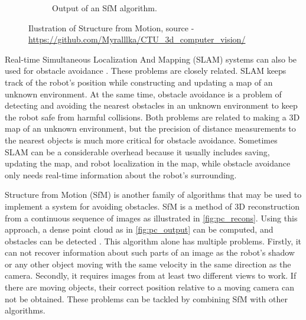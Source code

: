 \begin{figure}[h]
\begin{subfigure}[h]{0.65\textwidth}
      \caption{Output of an SfM algorithm.}
      \label{fig:pc_output}
    \end{subfigure}
    \caption[Ilustration of Structure from Motion.]{Ilustration of Structure from Motion, source - \url{https://github.com/Myralllka/CTU_3d_computer_vision/}}
    \label{fig:pc_recons}
\end{figure}

Real-time Simultaneous Localization And Mapping (SLAM) systems can also be used for obstacle avoidance \cite{Moreno2014}. 
These problems are closely related. 
SLAM keeps track of the robot's position while constructing and updating a map of an unknown environment. 
At the same time, obstacle avoidance is a problem of detecting and avoiding the nearest obstacles in an unknown environment to keep the robot safe from harmful collisions.
Both problems are related to making a 3D map of an unknown environment, but the precision of distance measurements to the nearest objects is much more critical for obstacle avoidance.
Sometimes SLAM can be a considerable overhead because it usually includes saving, updating the map, and robot localization in the map, while obstacle avoidance only needs real-time information about the robot's surrounding.

Structure from Motion (SfM) is another family of algorithms that may be used to implement a system for avoiding obstacles. 
SfM is a method of 3D reconstruction from a continuous sequence of images as illustrated in \autoref{fig:pc_recons}.
Using this approach, a dense point cloud as in \autoref{fig:pc_output} can be computed, and obstacles can be detected \cite{Lee2008}. 
This algorithm alone has multiple problems.
Firstly, it can not recover information about such parts of an image as the robot's shadow or any other object moving with the same velocity in the same direction as the camera.
Secondly, it requires images from at least two different views to work.
If there are moving objects, their correct position relative to a moving camera can not be obtained.
These problems can be tackled by combining SfM with other algorithms.

